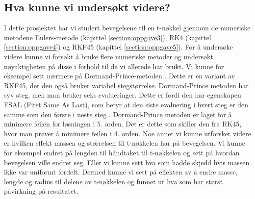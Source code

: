 \subsection{Hva kunne vi undersøkt videre?}
I dette prosjektet har vi studert bevegelsene til en t-nøkkel gjennom de numeriske metodene Eulers-metode (kapittel \ref{section:oppgave3}), RK4 (kapittel \ref{section:oppgave4}) og RKF45 (kapittel \ref{section:oppgave5}). For å undersøke videre kunne vi forsøkt å bruke flere numeriske metoder og undersøkt nøyaktigheten på disse i forhold til de vi allerede har brukt.\newline\newline
Vi kunne for eksempel sett nærmere på Dormand-Prince-metoden \cite{DORMAND:1}. Dette er en variant av RKF45, der den også bruker variabel stegstørrelse. Dormand-Prince metoden har syv steg, men man bruker seks evalueringer. Dette er fordi den har egenskapen FSAL (First Same As Last), som betyr at den siste evaluering i hvert steg er den samme som den første i neste steg \cite{DORMAND:1}. Dormand-Prince metoden er laget for å minimere feilen for løsningen i 5. orden. Det er dette som skiller den fra RK45, hvor man prøver å minimere feilen i 4. orden. \newline\newline
Noe annet vi kunne utforsket videre er hvilken effekt massen og størrelsen til t-nøkkelen har på bevegelsen. Vi kunne for eksempel endret på lengden til håndtaket til t-nøkkelen og sett på hvordan bevegelsen ville endret seg. Eller vi kunne sett hva som hadde skjedd hvis massen ikke var uniformt fordelt. Dermed kunne vi sett på effekten av å endre masse, lengde og radius til delene av t-nøkkelen og funnet ut hva som har størst påvirkning på resultatet.\newline
